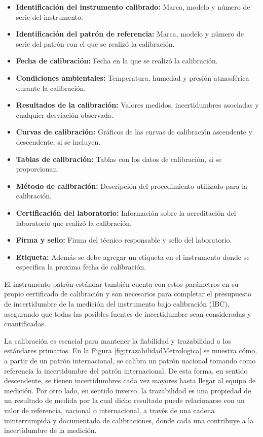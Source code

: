 \begin{itemize}
    \item \textbf{Identificación del instrumento calibrado:} Marca, modelo y número de serie del instrumento.
    \item \textbf{Identificación del patrón de referencia:} Marca, modelo y número de serie del patrón con el que se realizó la calibración.
    \item \textbf{Fecha de calibración:} Fecha en la que se realizó la calibración.
    \item \textbf{Condiciones ambientales:} Temperatura, humedad y presión atmosférica durante la calibración.
    \item \textbf{Resultados de la calibración:} Valores medidos, incertidumbres asociadas y cualquier desviación observada.
    \item \textbf{Curvas de calibración:} Gráficos de las curvas de calibración ascendente y descendente, si se incluyen.
    \item \textbf{Tablas de calibración:} Tablas con los datos de calibración, si se proporcionan.
    \item \textbf{Método de calibración:} Descripción del procedimiento utilizado para la calibración.
    \item \textbf{Certificación del laboratorio:} Información sobre la acreditación del laboratorio que realizó la calibración.
    \item \textbf{Firma y sello:} Firma del técnico responsable y sello del laboratorio.
    \item \textbf{Etiqueta:} Además se debe agregar un etiqueta en el instrumento donde se especifica la proxima fecha de calibración.
\end{itemize}

El instrumento patrón estándar también cuenta con estos parámetros en su propio certificado de calibración y son necesarios para completar el presupuesto de incertidumbre de la medición del instrumento bajo calibración (IBC), asegurando que todas las posibles fuentes de incertidumbre sean consideradas y cuantificadas.

La calibración es esencial para mantener la fiabilidad y trazabilidad a los estándares primarios. En la Figura \ref{fig:trazabilidadMetrologica} se muestra cómo, a partir de un patrón internacional, se calibra un patrón nacional tomando como referencia la incertidumbre del patrón internacional. De esta forma, en sentido descendente, se tienen incertidumbres cada vez mayores hasta llegar al equipo de medición. Por otro lado, en sentido inverso, la trazabilidad es una propiedad de un resultado de medida por la cual dicho resultado puede relacionarse con un valor de referencia, nacional o internacional, a través de una cadena ininterrumpida y documentada de calibraciones, donde cada una contribuye a la incertidumbre de la medición.

